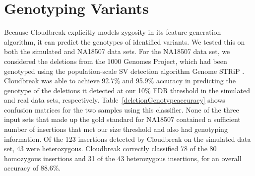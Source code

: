 \section{Genotyping Variants}\label{section_genotyping_eval}

Because Cloudbreak explicitly models zygosity in its feature generation algorithm, it can predict the genotypes of identified variants. We tested this on both the simulated and NA18507 data sets. For the NA18507 data set, we considered the deletions from the 1000 Genomes Project, which had been genotyped using the population-scale SV detection algorithm Genome STRiP \cite{Handsaker:2011ki}. Cloudbreak was able to achieve 92.7\% and 95.9\% accuracy in predicting the genotype of the deletions it detected at our 10\% FDR threshold in the simulated and real data sets, respectively. Table~\ref{deletionGenotypeaccuracy} shows confusion matrices for the two samples using this classifier. None of the three input sets that made up the gold standard for NA18507 contained a sufficient number of insertions that met our size threshold and also had genotyping information. Of the 123 insertions detected by Cloudbreak on the simulated data set, 43 were heterozygous. Cloudbreak correctly classified 78 of the 80 homozygous insertions and 31 of the 43 heterozygous insertions, for an overall accuracy of 88.6\%.

\begin{table}
\begin{center}
\end{center}
\caption{Confusion matrices for the predicted genotype of deletions found by Cloudbreak on both the simulated and NA18507 data sets.}
\label{deletionGenotypeaccuracy}
\end{table}

